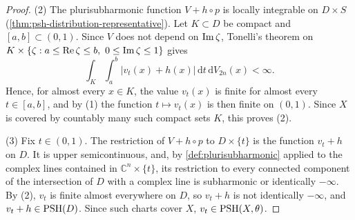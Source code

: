 \begin{proof}
(2) The plurisubharmonic function $V+h\circ p$ is locally integrable on $D\times S$ (\cref{thm:psh-distribution-representative}). Let $K\subset D$ be compact and $[a,b]\subset(0,1)$. Since $V$ does not depend on $\operatorname{Im}\zeta$, Tonelli's theorem on $K\times\{\zeta:a\leq\Real\zeta\leq b,\ 0\leq\Img\zeta\leq1\}$ gives
\[
 \int_K\int_a^b|v_t(x)+h(x)|\,\mathrm dt\,\mathrm dV_{2n}(x)<\infty.
\]
Hence, for almost every $x\in K$, the value $v_t(x)$ is finite for almost every $t\in[a,b]$, and by (1) the function $t\mapsto v_t(x)$ is then finite on $(0,1)$. Since $X$ is covered by countably many such compact sets $K$, this proves (2).

(3) Fix $t\in(0,1)$. The restriction of $V+h\circ p$ to $D\times\{t\}$ is the function $v_t+h$ on $D$. It is upper semicontinuous, and, by \cref{def:plurisubharmonic} applied to the complex lines contained in $\mathbb C^n\times\{t\}$, its restriction to every connected component of the intersection of $D$ with a complex line is subharmonic or identically $-\infty$. By (2), $v_t$ is finite almost everywhere on $D$, so $v_t+h$ is not identically $-\infty$, and $v_t+h\in\mathrm{PSH}(D)$. Since such charts cover $X$, $v_t\in\mathrm{PSH}(X,\theta)$.
\end{proof}

